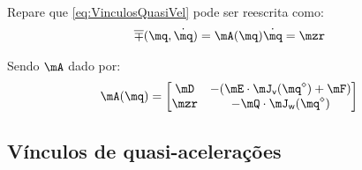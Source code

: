 \documentclass[]{politex}
\begin{document}
Repare que \eqref{eq:VinculosQuasiVel} pode ser reescrita como:
\begin{equation} \label{eq:VinculosQuasiVel2}
\overline{\mp}(\mq,\dot{\mq}) = \mA(\mq) \dot{\mq} = \mzr
\end{equation}

Sendo $\mA$ dado por:
\begin{equation}
\mA(\mq) = 
\begin{bmatrix}
\mD  & -(\mE \cdot \mJ_{\mathsf{v}}(\mq^\diamond) + \mF) \\
\mzr & -\mQ \cdot \mJ_{\mathsf{w}}(\mq^\diamond) \\
\end{bmatrix}
\end{equation}

\subsection{Vínculos de quasi-acelerações} 
\end{document}
